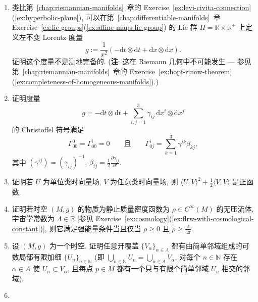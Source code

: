 \begin{RiemannExercise}
\begin{enumerate}[label=(\arabic*),ref=\arabic*,leftmargin=*]
\begin{enumerate}[label=(\alph*),leftmargin=*]
(\textbf{提示}: 注意 $(\mathbb{R}^3,\overline g)$ 的每个等距映射都确定 $(M,g)$ 的一个等距映射.)
\item 存在 $p,q\in M$ 可由任意长的类时曲线连接 [参见 Exercise~\ref{ex:hawking-singularity-theorem}(\ref{ex:maximal-timelike-geodesic-between-two-events})].
\end{enumerate}
\item\label{ex:incomplete-left-invariant-lorentzian-metric}
类比第~\ref{chap:riemannian-manifolds}~章的 Exercise~\ref{ex:levi-civita-connection}(\ref{ex:hyperbolic-plane}), 可以在第~\ref{chap:differentiable-manifolds}~章 Exercise~\ref{ex:lie-groups}(\ref{ex:affine-maps-lie-group}) 的 Lie 群 $H=\mathbb{R}\times\mathbb{R}^+$ 上定义左不变 Lorentz 度量
\[
  g:=\frac{1}{x^2}(-\mathrm{d}t\otimes\mathrm{d}t+\mathrm{d}x\otimes\mathrm{d}x).
\]
证明这个度量不是测地完备的. (\textbf{注}: 这在 Riemann 几何中不可能发生 --- 参见第~\ref{chap:riemannian-manifolds}~章的 Exercise~\ref{ex:hopf-rinow-theorem}(\ref{ex:completeness-of-homogeneous-manifolds}).)
\item\label{ex:christoffel-symbols-in-synchronized-coordinates}
证明度量
\[
  g=-\mathrm{d}t\otimes\mathrm{d}t+\sum_{i,j=1}^3\gamma_{ij}\,\mathrm{d}x^i\otimes\mathrm{d}x^j
\]
的 Christoffel 符号满足
\[
  \Gamma_{00}^0=\Gamma_{00}^i=0
  \qquad\text{且}\qquad
  \Gamma_{0j}^i=\sum_{k=1}^3\gamma^{ik}\beta_{kj},
\]
其中 $(\gamma^{ij})=(\gamma_{ij})^{-1}$, $\beta_{ij}=\frac{1}{2}\frac{\partial\gamma_{ij}}{\partial t}$.
\item\label{ex:positive-pressureless-fluid-energy-contraction}
证明若 $U$ 为单位类时向量场, $V$ 为任意类时向量场, 则 $\langle U,V\rangle^2+\frac12\langle V,V\rangle$ 是正函数.
\item\label{ex:strong-energy-condition-with-cosmological-constant}
证明若时空 $(M,g)$ 的物质为静止质量密度函数为 $\rho\in C^\infty(M)$ 的无压流体, 宇宙学常数为 $\Lambda\in\mathbb{R}$ [参见 Exercise~\ref{ex:cosmology}(\ref{ex:flrw-with-cosmological-constant})], 则它满足强能量条件当且仅当 $\rho\geq0$ 且 $\rho\geq\frac{\Lambda}{4\pi}$.
\item\label{ex:locally-finite-refinements-by-simple-neighborhoods}
设 $(M,g)$ 为一个时空. 证明任意开覆盖 $\{V_\alpha\}_{\alpha\in A}$ 都有由简单邻域组成的可数局部有限加细 $\{U_n\}_{n\in\mathbb{N}}$ (即 $\bigcup_{n\in\mathbb{N}}U_n=\bigcup_{\alpha\in A}V_\alpha$, 对每个 $n\in\mathbb{N}$ 存在 $\alpha\in A$ 使 $U_n\subset V_\alpha$, 且每点 $p\in M$ 都有一个只与有限个简单邻域 $U_n$ 相交的邻域).
\item\label{ex:prove-closed-causal-futures-and-compact-diamonds}

\end{enumerate}
\end{RiemannExercise}
